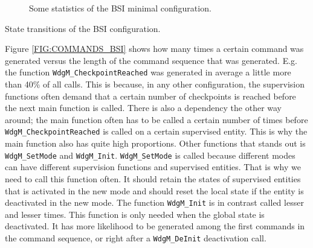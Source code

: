 \begin{figure}[!ht]
  \caption{Some statistics of the BSI minimal configuration.}
  \label{FIG:BSI}
\end{figure}

\begin{table}[!ht]
  \caption{State transitions of the BSI configuration.}
  \label{TABLE:STATUSES_BSI}
  
\end{table}

Figure \ref{FIG:COMMANDS_BSI} shows how many times a certain command
was generated versus the length of the command sequence that was
generated. E.g. the function \lstinline!WdgM_CheckpointReached! was
generated in average a little more than 40\% of all calls. This is
because, in any other configuration, the supervision functions often
demand that a certain number of checkpoints is reached before the next
main function is called. There is also a dependency the other way
around; the main function often has to be called a certain number of
times before \lstinline!WdgM_CheckpointReached! is called on a certain
supervised entity. This is why the main function also has quite high
proportions. Other functions that stands out is
\lstinline!WdgM_SetMode! and \lstinline!WdgM_Init!.
\lstinline!WdgM_SetMode! is called because different modes can have
different supervision functions and supervised entities. That is why
we need to call this function often. It should retain the states of
supervised entities that is activated in the new mode and should reset
the local state if the entity is deactivated in the new mode. The
function \lstinline!WdgM_Init! is in contrast called lesser and lesser
times. This function is only needed when the global state is
deactivated. It has more likelihood to be generated among the first
commands in the command sequence, or right after a
\lstinline!WdgM_DeInit! deactivation call.


